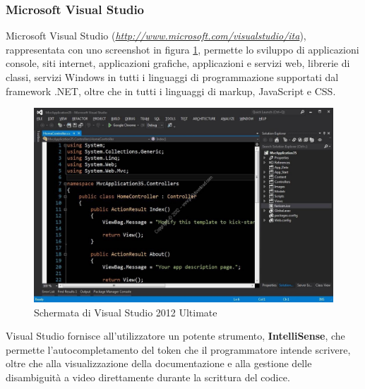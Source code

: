 \subsubsection{Microsoft Visual Studio}
Microsoft Visual Studio (\emph{\url{http://www.microsoft.com/visualstudio/ita}}), rappresentata con uno screenshot in figura \ref{vsimage}, permette lo sviluppo di applicazioni console, siti internet, applicazioni grafiche, applicazioni e servizi web, librerie di classi, servizi Windows in tutti i linguaggi di programmazione supportati dal framework .NET, oltre che in tutti i linguaggi di markup, JavaScript e CSS.

\begin{figure}
\begin{center}

\includegraphics[scale=0.3]{imgs/visualstudio.jpg} 
\caption{Schermata di Visual Studio 2012 Ultimate\label{vsimage}}
\end{center}

\end{figure}
Visual Studio fornisce all’utilizzatore un potente strumento, \textbf{IntelliSense}, che permette
l'autocompletamento del token che il programmatore intende scrivere, oltre che
alla visualizzazione della documentazione e alla gestione delle disambiguità a
video direttamente durante la scrittura del codice.

